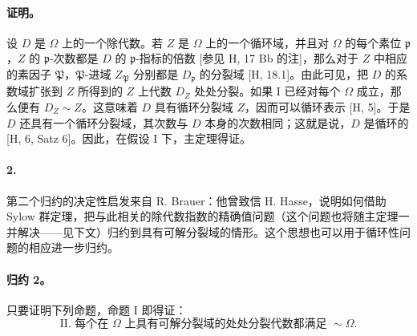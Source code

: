 \documentclass[11pt]{article}
\begin{document}
\paragraph{证明。}
设 \(D\) 是 \(\Omega\) 上的一个除代数。若 \(Z\) 是 \(\Omega\) 上的一个循环域，并且对 \(\Omega\) 的每个素位 \(\mathfrak p\)，\(Z\) 的 \(\mathfrak p\)-次数都是 \(D\) 的 \(\mathfrak p\)-指标的倍数 [参见 H, 17 Bb 的注]，那么对于 \(Z\) 中相应的素因子 \(\mathfrak P\)，\(\mathfrak P\)-进域 \(Z_{\mathfrak P}\) 分别都是 \(D_{\mathfrak p}\) 的分裂域 [H, 18.1]。由此可见，把 \(D\) 的系数域扩张到 \(Z\) 所得到的 \(Z\) 上代数 \(D_Z\) 处处分裂。如果 I 已经对每个 \(\Omega\) 成立，那么便有 \(D_Z\sim Z\)。这意味着 \(D\) 具有循环分裂域 \(Z\)，因而可以循环表示 [H, 5]。于是 \(D\) 还具有一个循环分裂域，其次数与 \(D\) 本身的次数相同；这就是说，\(D\) 是循环的 [H, 6, Satz 6]。因此，在假设 I 下，主定理得证。

\paragraph{2.}
第二个归约的决定性启发来自 R. Brauer：他曾致信 H. Hasse，说明如何借助 Sylow 群定理，把与此相关的除代数指数的精确值问题（这个问题也将随主定理一并解决——见下文）归约到具有可解分裂域的情形。这个思想也可以用于循环性问题的相应进一步归约。

\paragraph{归约 2。}
只要证明下列命题，命题 I 即得证：
\[
\text{II. 每个在 }\Omega\text{ 上具有可解分裂域的处处分裂代数都满足 }\sim\Omega .
\]
\end{document}

